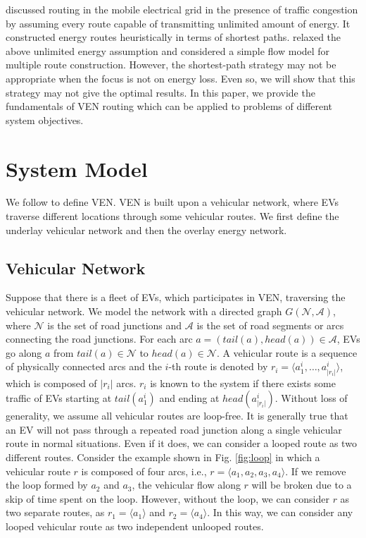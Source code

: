 \documentclass[journal]{IEEEtran}
\begin{document}
\cite{EVnetMASS} discussed routing in the mobile electrical grid in the presence of traffic congestion by assuming every route capable of transmitting unlimited amount of energy.
It constructed energy routes heuristically in terms of shortest paths. 
\cite{EVnetISGT2014} relaxed the above unlimited energy assumption and considered a simple flow model for multiple route construction.
However, the shortest-path strategy may not be appropriate when the focus is not on energy loss. Even so, we will show that this strategy may not give the optimal results. In this paper, we provide the fundamentals of VEN routing which can be applied to problems of different system objectives.  








\section{System Model} \label{sec:model}

We follow \cite{VEN} to define VEN. VEN is built upon a vehicular network, where EVs traverse different locations through some vehicular routes. We first define the underlay vehicular network and then the overlay energy network.

\subsection{Vehicular Network} 
Suppose that there is a fleet of EVs, which participates in VEN, traversing the vehicular network. We model the network with a directed graph $G(\mathcal{N},\mathcal{A})$, where $\mathcal{N}$ is the set of road junctions and $\mathcal{A}$ is the set of road segments or arcs connecting the road junctions. For each arc $a=(tail(a),head(a))\in\mathcal{A}$, EVs go along $a$ from $tail(a)\in\mathcal{N}$ to $head(a)\in\mathcal{N}$.
A vehicular route is a sequence of physically connected arcs and the $i$-th route is denoted by $r_i=\langle a^i_1,\ldots,a^i_{|r_i|} \rangle$, which is composed of $|r_i|$ arcs. $r_i$ is known to the system if there exists some traffic of EVs starting at $tail(a^i_1)$ and ending at $head(a^i_{|r_i|})$.
Without loss of generality, we assume all vehicular routes are loop-free. It is generally true that an EV will not pass through a repeated road junction along a single vehicular route in normal situations. Even if it does, we can consider a looped route as two different routes.
Consider the example shown in Fig. \ref{fig:loop} in which a vehicular route $r$  is composed of four arcs, i.e., $r=\langle a_1, a_2, a_3, a_4\rangle$. If we remove the loop formed by $a_2$ and $a_3$, the vehicular flow along $r$ will be broken due to a skip of time spent on the loop. However, without the loop, we can consider $r$ as two separate routes, as $r_1=\langle a_1 \rangle$ and $r_2=\langle a_4 \rangle$. In this way, we can consider any looped vehicular route as two independent unlooped routes.
\end{document}
